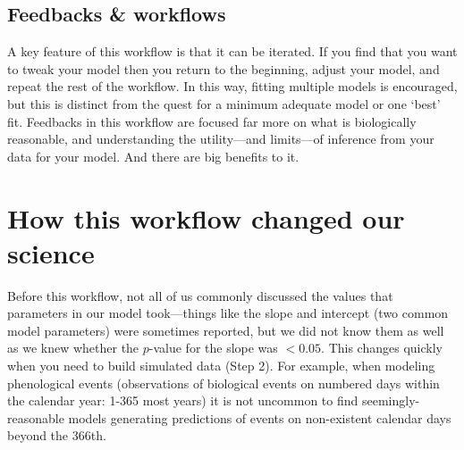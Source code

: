 \documentclass[11pt]{article}
\newcommand{\R}[1]{\label{}\linelabel{#1}}
\begin{document}
\subsection*{Feedbacks \& workflows}
A key feature of this workflow is that it can be iterated.  If you find that you want to tweak your model then you return to the beginning, adjust your model, and repeat the rest of the workflow. In this way, fitting multiple models is encouraged, but this is distinct from the quest for a minimum adequate model or one `best' fit. Feedbacks in this workflow are focused far more on what is biologically reasonable, and understanding the utility---and limits---of inference from your data for your model.  And there are big benefits to it. 


\section*{How this workflow changed our science} 
Before this workflow, not all of us commonly discussed the values that parameters in our model took---things like the slope and intercept (two common model parameters) were sometimes reported, but we did not know them as well as we knew whether the $p$-value for the slope was $<0.05$. This changes quickly when you need to build simulated data (Step 2). For example, when modeling phenological events (observations of biological events on numbered days within the calendar year: 1-365 most years) it is not uncommon to find seemingly-reasonable models generating predictions of events on non-existent calendar days beyond the 366th.\R{calendarday} %
\end{document}
